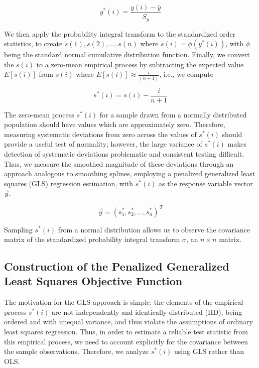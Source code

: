 \documentclass[12pt]{article}
\begin{document}
\begin{equation}
y^*(i)=\frac{y(i)-\bar{y}}{S_y}\label{eq15}
\end{equation}

We then apply the probability integral transform to the standardized order statistics, to create $s(1),s(2), ... ,s(n)$ where $s(i)=\phi(y^*(i))$, with $\phi$ being the standard normal cumulative distribution function. Finally, we convert the $s(i)$ to a zero-mean empirical process by subtracting the expected value $E[s(i)]$ from $s(i)$ where $E[s(i)] \approx \frac{i}{(n+1)}$, i.e., we compute 

\begin{equation}
s^*(i)=s(i)-\frac{i}{n+1}\label{eq16}
\end{equation}

The zero-mean process $s^*(i)$ for a sample drawn from a normally distributed population should have values which are approximately zero. Therefore, measuring systematic deviations from zero across the values of $s^*(i)$ should provide a useful test of normality; however, the large variance of $s^*(i)$ makes detection of systematic deviations problematic and consistent testing difficult. Thus, we measure the smoothed magnitude of these deviations through an approach analogous to smoothing splines, employing a penalized generalized least squares (GLS) regression estimation, with $s^*(i)$ as the response variable vector $\vec{y}$. 

\begin{equation}
\vec{y}=(s^*_1,s^*_2, ... ,s^*_n)^{\, T}\label{eq17}
\end{equation}

Sampling $s^*(i)$ from a normal distribution allows us to observe the covariance matrix of the standardized probability integral transform $\sigma$, an $n \times n$ matrix.

\subsection{Construction of the Penalized Generalized Least Squares Objective Function}

The motivation for the GLS approach is simple: the elements of the empirical process $s^*(i)$ are not independently and identically distributed (IID), being ordered and with unequal variance, and thus violate the assumptions of ordinary least squares regression. Thus, in order to estimate a reliable test statistic from this empirical process, we need to account explicitly for the covariance between the sample observations. Therefore, we analyze $s^*(i)$ using GLS rather than OLS.\\
\end{document}
